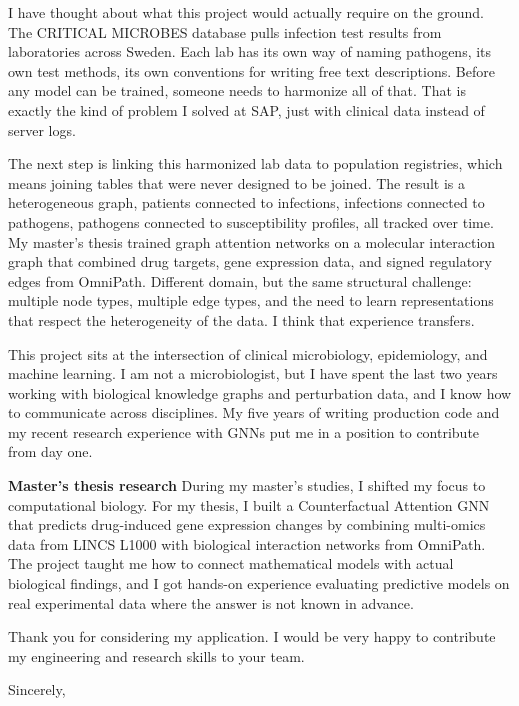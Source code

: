 \documentclass[11pt,a4paper]{article}
\begin{document}
I have thought about what this project would actually require on the ground. The CRITICAL MICROBES database pulls infection test results from laboratories across Sweden. Each lab has its own way of naming pathogens, its own test methods, its own conventions for writing free text descriptions. Before any model can be trained, someone needs to harmonize all of that. That is exactly the kind of problem I solved at SAP, just with clinical data instead of server logs.

The next step is linking this harmonized lab data to population registries, which means joining tables that were never designed to be joined. The result is a heterogeneous graph, patients connected to infections, infections connected to pathogens, pathogens connected to susceptibility profiles, all tracked over time. My master's thesis trained graph attention networks on a molecular interaction graph that combined drug targets, gene expression data, and signed regulatory edges from OmniPath. Different domain, but the same structural challenge: multiple node types, multiple edge types, and the need to learn representations that respect the heterogeneity of the data. I think that experience transfers.

This project sits at the intersection of clinical microbiology, epidemiology, and machine learning. I am not a microbiologist, but I have spent the last two years working with biological knowledge graphs and perturbation data, and I know how to communicate across disciplines. My five years of writing production code and my recent research experience with GNNs put me in a position to contribute from day one.

\textbf{Master's thesis research} During my master's studies, I shifted my focus to computational biology. For my thesis, I built a Counterfactual Attention GNN that predicts drug-induced gene expression changes by combining multi-omics data from LINCS L1000 with biological interaction networks from OmniPath. The project taught me how to connect mathematical models with actual biological findings, and I got hands-on experience evaluating predictive models on real experimental data where the answer is not known in advance.

Thank you for considering my application. I would be very happy to contribute my engineering and research skills to your team.

\renewcommand{\refname}{Selected references}



Sincerely,
\end{document}
